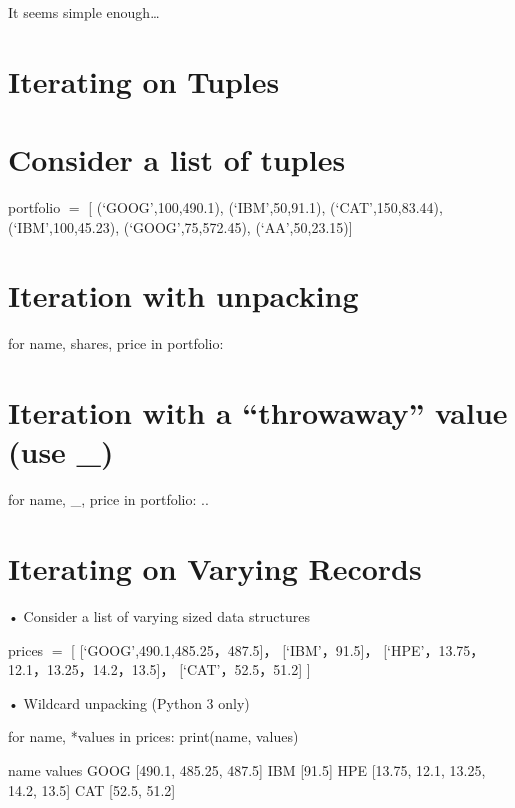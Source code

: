 \documentclass[
  letterpaper,
  DIV=11,
  numbers=noendperiod]{scrreprt}
\newenvironment{Shaded}{\begin{snugshade}}{\end{snugshade}}
\newcommand{\NormalTok}[1]{\textcolor[rgb]{0.00,0.23,0.31}{#1}}
\begin{document}
It seems simple enough\ldots{}


\chapter{Iterating on Tuples}\label{iterating-on-tuples}


\chapter{Consider a list of tuples}\label{consider-a-list-of-tuples}

portfolio \(=\) {[} (`GOOG',100,490.1), (`IBM',50,91.1),
(`CAT',150,83.44), (`IBM',100,45.23), (`GOOG',75,572.45),
(`AA',50,23.15){]}


\chapter{Iteration with unpacking}\label{iteration-with-unpacking}

for name, shares, price in portfolio:


\chapter{Iteration with a ``throwaway'' value (use
\_)}\label{iteration-with-a-throwaway-value-use-_}

for name, \_, price in portfolio: ..


\chapter{Iterating on Varying
Records}\label{iterating-on-varying-records}

• Consider a list of varying sized data structures

prices \(=\) {[} {[}`GOOG',490.1,485.25，487.5{]}， {[}`IBM'，91.5{]}，
{[}`HPE'，13.75，12.1，13.25，14.2，13.5{]}， {[}`CAT'，52.5，51.2{]}
{]}

• Wildcard unpacking (Python 3 only)

for name, *values in prices: print(name, values)

\begin{Shaded}
\begin{Highlighting}[]
\NormalTok{name values  }
\NormalTok{\textquotesingle{}GOOG\textquotesingle{} [490.1, 485.25, 487.5]  }
\NormalTok{\textquotesingle{}IBM\textquotesingle{} [91.5]  }
\NormalTok{\textquotesingle{}HPE\textquotesingle{} [13.75, 12.1, 13.25, 14.2, 13.5]  }
\NormalTok{\textquotesingle{}CAT\textquotesingle{} [52.5, 51.2] }
\end{Highlighting}
\end{Shaded}
\end{document}
